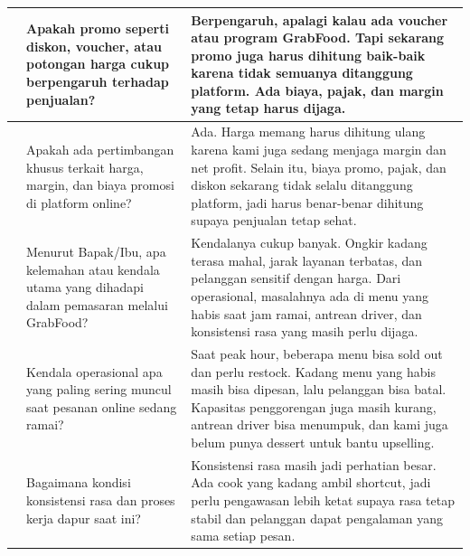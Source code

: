 {\begin{longtable}{|>{\centering\arraybackslash}p{0.7cm}|p{4.4cm}|p{7.8cm}|}
            9            & Apakah promo seperti diskon, voucher, atau potongan harga cukup berpengaruh terhadap penjualan?                                & Berpengaruh, apalagi kalau ada voucher atau program GrabFood. Tapi sekarang promo juga harus dihitung baik-baik karena tidak semuanya ditanggung platform. Ada biaya, pajak, dan margin yang tetap harus dijaga.                                                                                                                              \\ \hline
            10           & Apakah ada pertimbangan khusus terkait harga, margin, dan biaya promosi di platform online?                                    & Ada. Harga memang harus dihitung ulang karena kami juga sedang menjaga margin dan net profit. Selain itu, biaya promo, pajak, dan diskon sekarang tidak selalu ditanggung platform, jadi harus benar-benar dihitung supaya penjualan tetap sehat.                                                                                             \\ \hline
            11           & Menurut Bapak/Ibu, apa kelemahan atau kendala utama yang dihadapi dalam pemasaran melalui GrabFood?                            & Kendalanya cukup banyak. Ongkir kadang terasa mahal, jarak layanan terbatas, dan pelanggan sensitif dengan harga. Dari operasional, masalahnya ada di menu yang habis saat jam ramai, antrean driver, dan konsistensi rasa yang masih perlu dijaga.                                                                                           \\ \hline
            12           & Kendala operasional apa yang paling sering muncul saat pesanan online sedang ramai?                                            & Saat peak hour, beberapa menu bisa sold out dan perlu restock. Kadang menu yang habis masih bisa dipesan, lalu pelanggan bisa batal. Kapasitas penggorengan juga masih kurang, antrean driver bisa menumpuk, dan kami juga belum punya dessert untuk bantu upselling.                                                                         \\ \hline
            13           & Bagaimana kondisi konsistensi rasa dan proses kerja dapur saat ini?                                                            & Konsistensi rasa masih jadi perhatian besar. Ada cook yang kadang ambil shortcut, jadi perlu pengawasan lebih ketat supaya rasa tetap stabil dan pelanggan dapat pengalaman yang sama setiap pesan.                                                                                                                                           \\ \hline

\end{longtable}}
